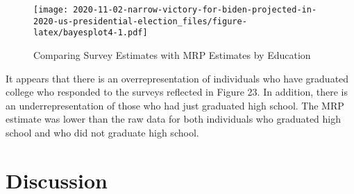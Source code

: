 \documentclass[
]{article}
\begin{document}
\begin{figure}
\centering
\texttt{[image: 2020-11-02-narrow-victory-for-biden-projected-in-2020-us-presidential-election\_files/figure-latex/bayesplot4-1.pdf]}
\caption{\label{fig:bayesplot4}Comparing Survey Estimates with MRP Estimates by Education}
\end{figure}

It appears that there is an overrepresentation of individuals who have graduated college who responded to the surveys reflected in Figure 23. In addition, there is an underrepresentation of those who had just graduated high school. The MRP estimate was lower than the raw data for both individuals who graduated high school and who did not graduate high school.

\hypertarget{discussion}{%
\section{Discussion}\label{discussion}}
\end{document}
